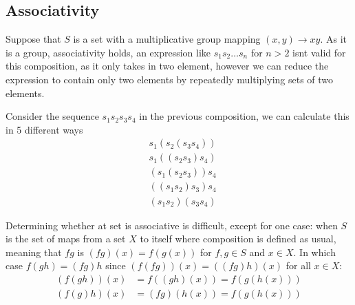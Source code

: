 \subsection{Associativity}
Suppose that $S$ is a set with a multiplicative group mapping $(x,y)\rightarrow xy$. As it is a group, associativity holds, an expression like $s_{1}s_{2}\ldots s_{n}$ for $n>2$ isnt valid for this composition, as it only takes in two element, however we can reduce the expression to contain only two elements by repeatedly multiplying sets of two elements.
\begin{exmp}
  Consider the sequence $s_{1}s_{2}s_{3}s_{4}$ in the previous composition, we can calculate this in 5 different ways
  \begin{align*}
    &s_{1}(s_{2}(s_{3}s_{4})) \\
    &s_{1}((s_{2}s_{3})s_{4}) \\
    &(s_{1}(s_{2}s_{3}))s_{4} \\
    &((s_{1}s_{2})s_{3})s_{4} \\
    &(s_{1}s_{2})(s_{3}s_{4})
  \end{align*}
\end{exmp}
Determining whether at set is associative is difficult, except for one case: when $S$ is the set of maps from a set $X$ to itself where composition is defined as usual, meaning that $fg$ is $(fg)(x)=f(g(x))$ for $f,g\in S$ and $x\in X$. In which case $f(gh)=(fg)h$ since $(f(fg))(x)=((fg)h)(x)$ for all $x\in X$:
\begin{align*}
    (f(gh))(x)&=f((gh)(x))=f(g(h(x))) \\
    (f(g)h)(x)&=(fg)(h(x))=f(g(h(x)))
\end{align*}
